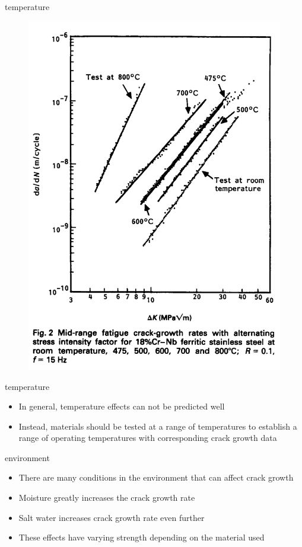 \documentclass[10pt]{beamer}
\begin{document}
\begin{frame}{temperature}
	\begin{figure}
	\centering
	\includegraphics[width=0.6\linewidth]{../Figures/temperature_growth}
	\label{fig:temperature_growth}
	\end{figure}
\end{frame}

\begin{frame}{temperature}
	\begin{itemize}[<+->]
		\item In general, temperature effects can not be predicted well
		\item Instead, materials should be tested at a range of temperatures to establish a range of operating temperatures with corresponding crack growth data
	\end{itemize}
\end{frame}

\begin{frame}{environment}
	\begin{itemize}[<+->]
		\item There are many conditions in the environment that can affect crack growth
		\item Moisture greatly increases the crack growth rate
		\item Salt water increases crack growth rate even further
		\item These effects have varying strength depending on the material used
	\end{itemize}
\end{frame}
\end{document}

